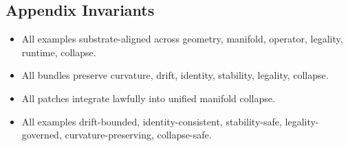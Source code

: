 \subsection{Appendix Invariants}
\begin{itemize}
    \item All examples substrate-aligned across geometry, manifold, operator, legality, runtime, collapse.
    \item All bundles preserve curvature, drift, identity, stability, legality, collapse.
    \item All patches integrate lawfully into unified manifold collapse.
    \item All examples drift-bounded, identity-consistent, stability-safe, legality-governed, curvature-preserving, collapse-safe.
\end{itemize}
